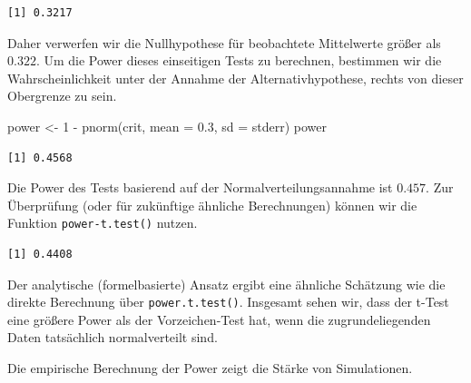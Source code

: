 \documentclass[
  ngerman,
]{scrbook}
\newenvironment{Shaded}{\begin{snugshade}}{\end{snugshade}}
\newcommand{\AttributeTok}[1]{\textcolor[rgb]{0.77,0.63,0.00}{#1}}
\newcommand{\DecValTok}[1]{\textcolor[rgb]{0.00,0.00,0.81}{#1}}
\newcommand{\FloatTok}[1]{\textcolor[rgb]{0.00,0.00,0.81}{#1}}
\newcommand{\FunctionTok}[1]{\textcolor[rgb]{0.00,0.00,0.00}{#1}}
\newcommand{\NormalTok}[1]{#1}
\newcommand{\OtherTok}[1]{\textcolor[rgb]{0.56,0.35,0.01}{#1}}
\newcommand{\SpecialCharTok}[1]{\textcolor[rgb]{0.00,0.00,0.00}{#1}}
\newcommand{\StringTok}[1]{\textcolor[rgb]{0.31,0.60,0.02}{#1}}
\newenvironment{note}[1]
  {
  \begin{itemize}
  \renewcommand{\labelitemi}{
    \raisebox{-.01\height}[0pt][0pt]{
      {\setkeys{Gin}{width=7em,keepaspectratio}
        {\normalsize \textcolor{dark-fom-green}\faHashtag}}
        }
  }
  \begin{blackbox}
   \item
    }
    {
  \end{blackbox}
  \end{itemize}
  }
\begin{document}
\begin{verbatim}
[1] 0.3217
\end{verbatim}

Daher verwerfen wir die Nullhypothese für beobachtete Mittelwerte größer als \(0.322\).
Um die Power dieses einseitigen Tests zu berechnen, bestimmen wir die Wahrscheinlichkeit unter der Annahme der Alternativhypothese, rechts von dieser Obergrenze zu sein.

\begin{Shaded}
\begin{Highlighting}[]
\NormalTok{power }\OtherTok{\textless{}{-}} \DecValTok{1} \SpecialCharTok{{-}} \FunctionTok{pnorm}\NormalTok{(crit, }\AttributeTok{mean =} \FloatTok{0.3}\NormalTok{, }\AttributeTok{sd =}\NormalTok{ stderr)}
\NormalTok{power}
\end{Highlighting}
\end{Shaded}

\begin{verbatim}
[1] 0.4568
\end{verbatim}

Die Power des Tests basierend auf der Normalverteilungsannahme ist \(0.457\). Zur Überprüfung (oder für zukünftige ähnliche Berechnungen) können wir die Funktion \texttt{power-t.test()} nutzen.

\begin{Shaded}
\end{Shaded}

\begin{verbatim}
[1] 0.4408
\end{verbatim}

Der analytische (formelbasierte) Ansatz ergibt eine ähnliche Schätzung wie die direkte Berechnung über \texttt{power.t.test()}.
Insgesamt sehen wir, dass der t-Test eine größere Power als der Vorzeichen-Test hat, wenn die zugrundeliegenden Daten tatsächlich normalverteilt sind.

\begin{note}{note}
Die empirische Berechnung der Power zeigt die Stärke von Simulationen.

\end{note}
\end{document}
